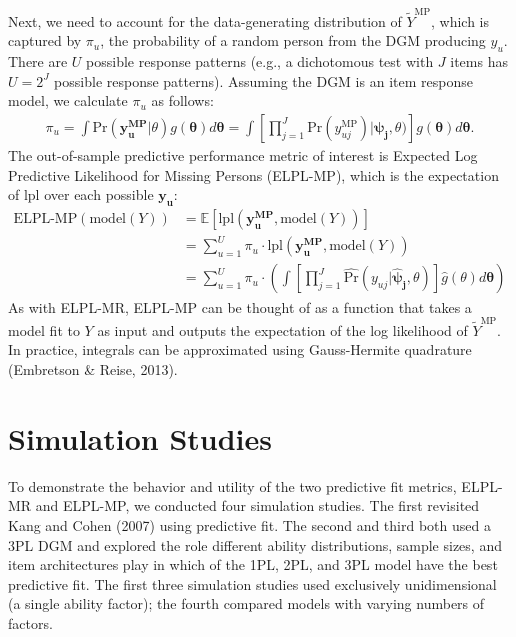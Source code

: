 \documentclass[
  english,
  man,floatsintext]{apa7}
\begin{document}
Next, we need to account for the data-generating distribution of \(\tilde Y^{\text{MP}}\), which is captured by \(\pi_u\), the probability of a random person from the DGM producing \(y_u\). There are \(U\) possible response patterns (e.g., a dichotomous test with \(J\) items has \(U = 2^J\) possible response patterns). Assuming the DGM is an item response model, we calculate \(\pi_u\) as follows:
\begin{align}
\pi_u = \int {\text{Pr}}(\bm{y_u^\text{MP}}|\theta) g(\bm{\theta}) d\bm{\theta} = \int \left[\prod_{j=1}^{J} {\text{Pr}}(y_{uj}^\text{MP}) | \bm{\psi_j}, \theta) \right] g(\bm{\theta}) d\bm{\theta}.
\end{align}
The out-of-sample predictive performance metric of interest is Expected Log Predictive Likelihood for Missing Persons (ELPL-MP), which is the expectation of lpl over each possible \(\bm{y_u}\):
\begin{align}
\text{ELPL-MP}(\text{model}(Y)) &= \mathbb{E}\left[\text{lpl}(\bm{y_u^\text{MP}}, \text{model}(Y))\right] \\ &= \sum_{u=1}^{U} \pi_u \cdot \text{lpl}(\bm{y_u^\text{MP}}, \text{model}(Y)) \\ &= \sum_{u=1}^{U} \pi_u \cdot \left( \int \left[\prod_{j=1}^{J} \hat{\text{Pr}}(y_{uj} | \bm{\hat\psi_j}, \theta) \right] \hat g(\theta) d\bm{\theta} \right) \label{eq:elplmp}
\end{align}
As with ELPL-MR, ELPL-MP can be thought of as a function that takes a model fit to \(Y\) as input and outputs the expectation of the log likelihood of \(\tilde Y^{\text{MP}}\). In practice, integrals can be approximated using Gauss-Hermite quadrature (Embretson \& Reise, 2013).

\hypertarget{sim}{%
\section{Simulation Studies}\label{sim}}

To demonstrate the behavior and utility of the two predictive fit metrics, ELPL-MR and ELPL-MP, we conducted four simulation studies. The first revisited Kang and Cohen (2007) using predictive fit. The second and third both used a 3PL DGM and explored the role different ability distributions, sample sizes, and item architectures play in which of the 1PL, 2PL, and 3PL model have the best predictive fit. The first three simulation studies used exclusively unidimensional (a single ability factor); the fourth compared models with varying numbers of factors.
\end{document}
